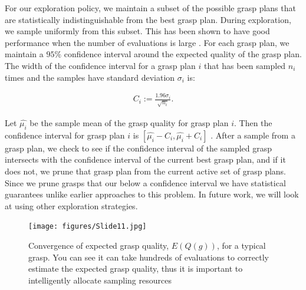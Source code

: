 \documentclass[letterpaper, 10 pt, conference]{ieeeconf}  %
\begin{document}
For our exploration policy, we maintain a subset of the possible grasp plans that are statistically indistinguishable from the best grasp plan.
During exploration, we sample uniformly from this subset.
This has been shown to have good performance when the number of evaluations is large \cite{bubeck2009pure}.
For each grasp plan, we maintain a $95\%$ confidence interval around the expected quality of the grasp plan.
The width of the confidence interval for a grasp plan $i$ that has been sampled $n_i$ times and the samples have standard deviation $\sigma_i$ is:

\vspace{-2ex}
\begin{align}
C_{ i} := \frac{1.96 \sigma_i}{\sqrt{n_i}}.
\end{align}

Let $\hat{\mu_i}$ be the sample mean of the grasp quality for grasp plan $i$.
Then the confidence interval for grasp plan $i$ is $[\hat{\mu_i} - C_i, \hat{\mu_i} + C_i]$ \cite{caflisch1998monte}.  
After a sample from a grasp plan, we check to see if the confidence interval of the sampled grasp intersects with the confidence interval of the current best grasp plan, and if it does not, we prune that grasp plan from the current active set of  grasp plans. Since we prune grasps that our below a confidence interval we have statistical guarantees unlike earlier approaches to this problem\cite{kehoe2012toward}. In future work, we will look at using other exploration strategies. 




\begin{figure}[ht!]
\centering
\texttt{[image: figures/Slide11.jpg]}
\caption{ \footnotesize Convergence of expected grasp quality, $E(Q(g))$,  for a typical grasp. You can see it can take hundreds of evaluations to correctly estimate the expected grasp quality, thus it is important to  intelligently allocate sampling resources}
\vspace*{-10pt}
\label{fig:sampling_convergence}
\end{figure} 
\end{document}
